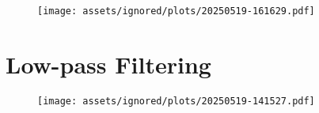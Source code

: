 \begin{figure}[!ht]
    \centering
    \texttt{[image: assets/ignored/plots/20250519-161629.pdf]}
    \caption{}
    \label{fig:results:tpc:bend:1:pos}
\end{figure}

\FloatBarrier


\section{Low-pass Filtering}
\label{sec:results:lowpass}
\begin{figure}[h!]
    \centering
    \texttt{[image: assets/ignored/plots/20250519-141527.pdf]}
    \caption{}
    \label{fig:results:tpc:stretch:1:task:3}
\end{figure}


\label{sec:results:lowpass_filtering}
